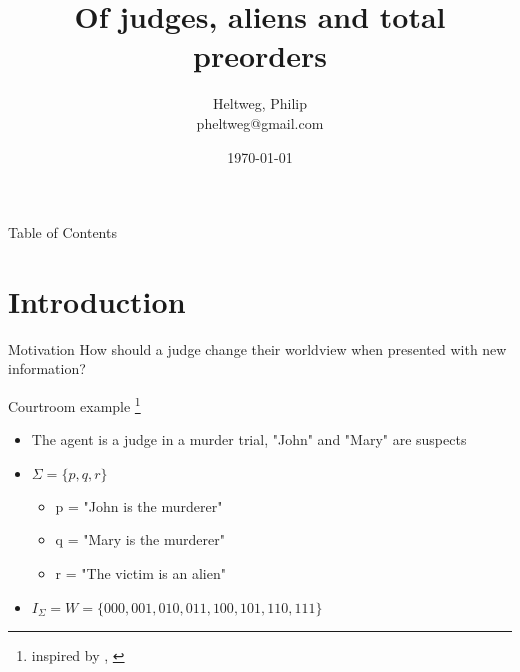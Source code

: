 \documentclass[11pt]{beamer}
\begin{document}
\title{Of judges, aliens and total preorders}
\author[Heltweg, Philip]{Heltweg, Philip\\pheltweg@gmail.com}
\date{\today}

\frame{\titlepage}

\begin{frame}{Table of Contents}
    \tableofcontents
    
\end{frame}

\section{Introduction}

\begin{frame}{Motivation}
    How should a judge change their worldview when presented with new information?  
\end{frame}

\begin{frame}{Courtroom example \footnote{inspired by \cite{Booth2011}, \cite{Darwiche1997}}}
    \begin{itemize}
        \item The agent is a judge in a murder trial, "John" and "Mary" are suspects
        \item $\Sigma = \{ p, q, r\}$
        \begin{itemize}
            \item p = "John is the murderer"
            \item q = "Mary is the murderer"
            \item r = "The victim is an alien"
        \end{itemize}
        \item  $I_{\Sigma} = W = \{ 000, 001, 010, 011, 100, 101, 110, 111\}$ 
    \end{itemize} 
\end{frame}
\end{document}
